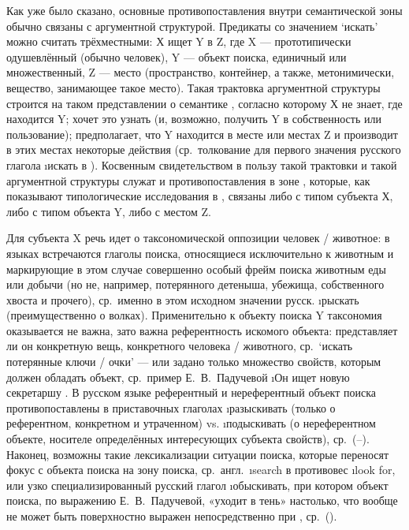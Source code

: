 Как уже было сказано, основные противопоставления внутри семантической зоны обычно связаны с аргументной структурой. Предикаты со значением ‘искать’ можно считать трёхместными: Х ищет Y в Z, где X — прототипически одушевлённый (обычно человек), Y — объект поиска, единичный или множественный, Z — место (пространство, контейнер, а также, метонимически, вещество, занимающее такое место). Такая трактовка аргументной структуры строится на таком представлении о семантике , согласно которому Х не знает, где находится Y; хочет это узнать (и, возможно, получить Y в собственность или пользование); предполагает, что Y находится в месте или местах Z и производит в этих местах некоторые действия (ср.~толкование для первого значения русского глагола \i{искать} в \parencite{uryson2023}). Косвенным свидетельством в пользу такой трактовки и такой аргументной структуры служат и противопоставления в зоне , которые, как показывают типологические исследования в \parencite{eureka2018}, связаны либо с типом субъекта Х, либо с типом объекта Y, либо с местом Z.

Для субъекта X речь идет о таксономической оппозиции человек / животное: в языках встречаются глаголы поиска, относящиеся исключительно к животным и маркирующие в этом случае совершенно особый фрейм поиска животным еды или добычи (но не, например, потерянного детеныша, убежища, собственного хвоста и прочего), ср.~именно в этом исходном значении русск. \i{рыскать} (преимущественно о волках). Применительно к объекту поиска Y таксономия оказывается не важна, зато важна референтность искомого объекта: представляет ли он конкретную вещь, конкретного человека / животного, ср.~‘искать потерянные ключи / очки’ — или задано только множество свойств, которым должен обладать объект, ср.~пример Е.~В.~Падучевой \i{Он ищет новую секретаршу} \parencite[94]{paducheva1985}. В русском языке референтный и нереферентный объект поиска противопоставлены в приставочных глаголах \i{разыскивать} (только о референтном, конкретном и утраченном) vs. \i{подыскивать} (о нереферентном объекте, носителе определённых интересующих субъекта свойств), ср.~(–). Наконец, возможны такие лексикализации ситуации поиска, которые переносят фокус с объекта поиска на зону поиска, ср.~англ.~\i{search} в противовес \i{look for}, или узко специализированный русский глагол \i{обыскивать}, при котором объект поиска, по выражению Е.~В.~Падучевой, «уходит в тень» настолько, что вообще не может быть поверхностно выражен непосредственно при , ср.~().

